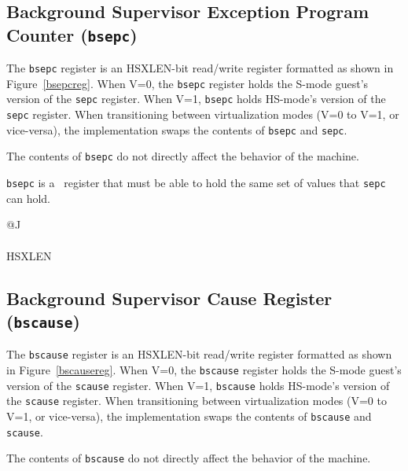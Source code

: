 \subsection{Background Supervisor Exception Program Counter ({\tt bsepc})}

The {\tt bsepc} register is an HSXLEN-bit read/write register formatted as shown
in Figure~\ref{bsepcreg}.  When V=0, the {\tt bsepc} register holds the
S-mode guest's version of the {\tt sepc} register.  When V=1, {\tt bsepc}
holds HS-mode's version of the {\tt sepc} register.  When transitioning between
virtualization modes (V=0 to V=1, or vice-versa), the implementation swaps the
contents of {\tt bsepc} and {\tt sepc}.

The contents of {\tt bsepc} do not directly affect the behavior of
the machine.

{\tt bsepc} is a \warl\ register that must be able to hold the same set of
values that {\tt sepc} can hold.

\begin{figure*}[h!]
{\footnotesize
\begin{center}
\begin{tabular}{@{}J}
 \\
\hline
{} \\
\hline
HSXLEN \\
\end{tabular}
\end{center}
}
\vspace{-0.1in}
\caption{Background supervisor exception program counter ({\tt bsepc}).}
\label{bsepcreg}
\end{figure*}

\subsection{Background Supervisor Cause Register ({\tt bscause})}

The {\tt bscause} register is an HSXLEN-bit read/write register formatted as shown
in Figure~\ref{bscausereg}.  When V=0, the {\tt bscause} register holds the
S-mode guest's version of the {\tt scause} register.  When V=1, {\tt bscause}
holds HS-mode's version of the {\tt scause} register.  When transitioning between
virtualization modes (V=0 to V=1, or vice-versa), the implementation swaps the
contents of {\tt bscause} and {\tt scause}.

The contents of {\tt bscause} do not directly affect the behavior of
the machine.


